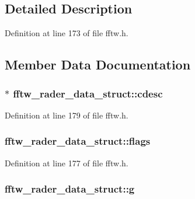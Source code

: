 \subsection{Detailed Description}


Definition at line 173 of file fftw.\+h.



\subsection{Member Data Documentation}
\subsubsection[{\texorpdfstring{cdesc}{cdesc}}]{$\ast$ fftw\+\_\+rader\+\_\+data\+\_\+struct\+::cdesc}\hypertarget{structfftw__rader__data__struct_a0dbac3bc83b52b0bd26b716a030d0ee8}{}\label{structfftw__rader__data__struct_a0dbac3bc83b52b0bd26b716a030d0ee8}


Definition at line 179 of file fftw.\+h.

\subsubsection[{\texorpdfstring{flags}{flags}}]{ fftw\+\_\+rader\+\_\+data\+\_\+struct\+::flags}\hypertarget{structfftw__rader__data__struct_a38ce2e82dafdd0d54eeeff4739a8f533}{}\label{structfftw__rader__data__struct_a38ce2e82dafdd0d54eeeff4739a8f533}


Definition at line 177 of file fftw.\+h.

\subsubsection[{\texorpdfstring{g}{g}}]{ fftw\+\_\+rader\+\_\+data\+\_\+struct\+::g}\hypertarget{structfftw__rader__data__struct_ac68beea87d3834df881cd1280844c137}{}\label{structfftw__rader__data__struct_ac68beea87d3834df881cd1280844c137}


